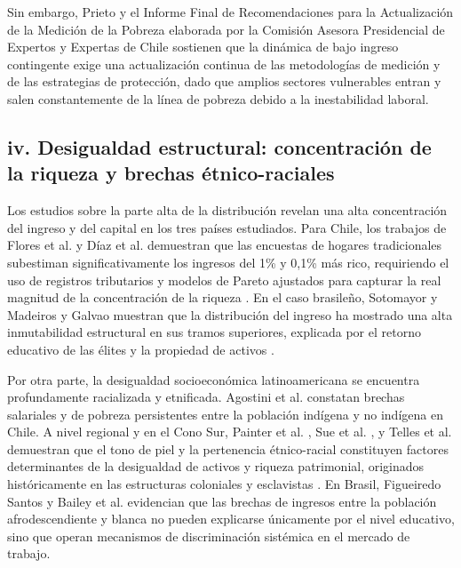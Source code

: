 Sin embargo, Prieto \parencite*{Prieto2024} y el Informe Final de Recomendaciones para la Actualización de la Medición de la Pobreza elaborada por la Comisión Asesora Presidencial de Expertos y Expertas de Chile \parencite*{InformeFinalRecomendaciones2025} sostienen que la dinámica de bajo ingreso contingente exige una actualización continua de las metodologías de medición y de las estrategias de protección, dado que amplios sectores vulnerables entran y salen constantemente de la línea de pobreza debido a la inestabilidad laboral.

\subsection{iv. Desigualdad estructural: concentración de la riqueza y brechas étnico-raciales}

Los estudios sobre la parte alta de la distribución revelan una alta concentración del ingreso y del capital en los tres países estudiados. Para Chile, los trabajos de Flores et al. \parencite*{Floresetal2020} y Díaz et al. \parencite*{Diazetal2021} demuestran que las encuestas de hogares tradicionales subestiman significativamente los ingresos del 1\% y 0,1\% más rico, requiriendo el uso de registros tributarios y modelos de Pareto ajustados para capturar la real magnitud de la concentración de la riqueza \parencite{Contreras1999, BravoValderrama2011}. En el caso brasileño, Sotomayor \parencite*{Sotomayor2008} y Madeiros y Galvao \parencite*{MadeirosGalvao2014} muestran que la distribución del ingreso ha mostrado una alta inmutabilidad estructural en sus tramos superiores, explicada por el retorno educativo de las élites y la propiedad de activos \parencite{Nascimientoetal1999}.

Por otra parte, la desigualdad socioeconómica latinoamericana se encuentra profundamente racializada y etnificada. Agostini et al. \parencite*{Agostinietal2010} constatan brechas salariales y de pobreza persistentes entre la población indígena y no indígena en Chile. A nivel regional y en el Cono Sur, Painter et al. \parencite*{Painteretal2020}, Sue et al. \parencite*{Sueetal2024}, y Telles et al. \parencite*{Tellesetal2025} demuestran que el tono de piel y la pertenencia étnico-racial constituyen factores determinantes de la desigualdad de activos y riqueza patrimonial, originados históricamente en las estructuras coloniales y esclavistas \parencite{Soaresetal2012, Gradin2014}. En Brasil, Figueiredo Santos \parencite*{FigueiredoSantos2005} y Bailey et al. \parencite*{Baileyetal2014} evidencian que las brechas de ingresos entre la población afrodescendiente y blanca no pueden explicarse únicamente por el nivel educativo, sino que operan mecanismos de discriminación sistémica en el mercado de trabajo.

